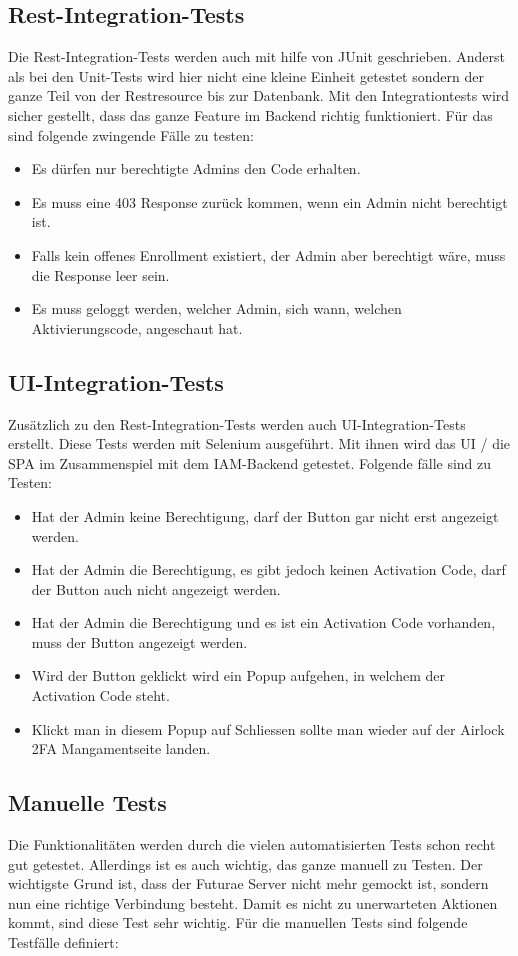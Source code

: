 \subsection{Rest-Integration-Tests}
Die Rest-Integration-Tests werden auch mit hilfe von JUnit geschrieben. Anderst als bei den Unit-Tests wird hier nicht eine kleine Einheit getestet sondern der ganze Teil von der Restresource bis zur Datenbank.
Mit den Integrationtests wird sicher gestellt, dass das ganze Feature im Backend richtig funktioniert. Für das sind folgende zwingende Fälle zu testen:

\begin{itemize}
	\item Es dürfen nur berechtigte Admins den Code erhalten.
	\item Es muss eine 403 Response zurück kommen, wenn ein Admin nicht berechtigt ist.
	\item Falls kein offenes Enrollment existiert, der Admin aber berechtigt wäre, muss die Response leer sein.
	\item Es muss geloggt werden, welcher Admin, sich wann, welchen Aktivierungscode, angeschaut hat.
\end{itemize}

\subsection{UI-Integration-Tests}
Zusätzlich zu den Rest-Integration-Tests werden auch UI-Integration-Tests erstellt. Diese Tests werden mit Selenium ausgeführt. Mit ihnen wird das UI / die SPA im Zusammenspiel mit dem IAM-Backend getestet.
Folgende fälle sind zu Testen:
\begin{itemize}
	\item Hat der Admin keine Berechtigung, darf der Button gar nicht erst angezeigt werden.
	\item Hat der Admin die Berechtigung, es gibt jedoch keinen Activation Code, darf der Button auch nicht angezeigt werden.
	\item Hat der Admin die Berechtigung und es ist ein Activation Code vorhanden, muss der Button angezeigt werden.
	\item Wird der Button geklickt wird ein Popup aufgehen, in welchem der Activation Code steht.
	\item Klickt man in diesem Popup auf Schliessen sollte man wieder auf der Airlock 2FA Mangamentseite landen.
\end{itemize}
\newpage

\subsection{Manuelle Tests}
Die Funktionalitäten werden durch die vielen automatisierten Tests schon recht gut getestet. Allerdings ist es auch wichtig, das ganze manuell zu Testen. Der wichtigste Grund ist, dass der Futurae Server nicht mehr gemockt ist, sondern nun eine richtige Verbindung besteht. Damit es nicht zu unerwarteten Aktionen kommt, sind diese Test sehr wichtig. Für die manuellen Tests sind folgende Testfälle definiert:

